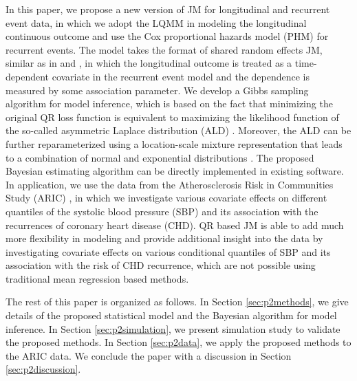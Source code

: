 In this paper, we propose a new version of JM for longitudinal and recurrent event data, in which we adopt the LQMM in modeling the longitudinal continuous outcome and use the Cox proportional hazards model (PHM) for recurrent events. The model takes the format of shared random effects JM, similar as in \cite{wulfsohn1997joint} and \cite{rizopoulos2011dynamic}, in which the longitudinal outcome is treated as a time-dependent covariate in the recurrent event model and the dependence is measured by some association parameter. We develop a Gibbs sampling algorithm for model inference, which is based on the fact that minimizing the original QR loss function is equivalent to maximizing the likelihood function of the so-called asymmetric Laplace distribution (ALD) \citep{yu2001bayesian}. Moreover, the ALD can be further reparameterized using a location-scale mixture representation that leads to a combination of normal and exponential distributions \citep{kotz2001laplace, kozumi2011gibbs,luo2012bayesian}. The proposed Bayesian estimating algorithm can be directly implemented in existing software. In application, we use the data from the Atherosclerosis Risk in Communities Study (ARIC) \citep{aric1989atherosclerosis}, in which we investigate various covariate effects on different quantiles of the systolic blood pressure (SBP) and its association with the recurrences of coronary heart disease (CHD). QR based JM is able to add much more flexibility in modeling and provide additional insight into the data by investigating covariate effects on various conditional quantiles of SBP and its association with the risk of CHD recurrence, which are not possible using traditional mean regression based methods.





The rest of this paper is organized as follows. In Section \ref{sec:p2methods}, we give details of the proposed statistical model and the Bayesian algorithm for model inference. In Section \ref{sec:p2simulation}, we present simulation study to validate the proposed methods. In Section \ref{sec:p2data}, we apply the proposed methods to the ARIC data. We conclude the paper with a discussion in Section \ref{sec:p2discussion}.
% 
% 

